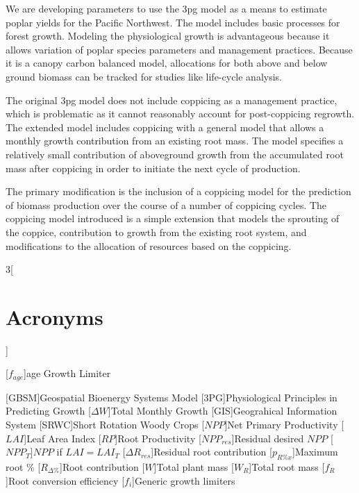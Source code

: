 \documentclass[10pt]{article}
\begin{document}
We are developing parameters to use the \acf{3pg} model as a means to
estimate poplar yields for the Pacific Northwest.  The model includes
basic processes for forest growth.  Modeling the physiological growth
is advantageous because it allows variation of poplar species
parameters and management practices.  Because it is a canopy carbon
balanced model, allocations for both above and below ground biomass
can be tracked for studies like life-cycle analysis.

The original \ac{3pg} model does not include coppicing as a management
practice, which is problematic as it cannot reasonably account for
post-coppicing regrowth.  The extended model includes coppicing with a
general model that allows a monthly growth contribution from an
existing root mass.  The model specifies a relatively small
contribution of aboveground growth from the accumulated root mass
after coppicing in order to initiate the next cycle of production.

The primary modification is the inclusion of a coppicing model for the
prediction of biomass production over the course of a number of
coppicing cycles.  The coppicing model introduced is a simple extension
that models the sprouting of the coppice, contribution to growth from
the existing root system, and modifications to the allocation of
resources based on the coppicing.

\begin{multicols}{3}[\section*{Acronyms}]
{\normalsize
\raggedright
\begin{acronym}
[\ensuremath{f_{age}}]{age Growth Limiter}

[\textsc{GBSM}]{Geospatial Bioenergy Systems Model}
[\textsc{3PG}]{Physiological Principles in Predicting Growth}
[\ensuremath{\Delta W}]{Total Monthly Growth}
[\textsc{GIS}]{Geograhical Information System}
[\textsc{SRWC}]{Short Rotation Woody Crops}
[\ensuremath{NPP}]{Net Primary Productivity}
[\ensuremath{LAI}]{Leaf Area Index}
[\ensuremath{RP}]{Root Productivity}
[\ensuremath{NPP_{res}}]{Residual desired $NPP$}
[\ensuremath{NPP_{T}}]{$NPP$ if $LAI = LAI_{T}$}
[\ensuremath{\Delta R_{res}}]{Residual root contribution}
[\ensuremath{p_{R\%x}}]{Maximum root \%}
[\ensuremath{R_{\Delta\%}}]{Root contribution}
[\ensuremath{W}]{Total plant mass}
[\ensuremath{W_R}]{Total root mass}
[\ensuremath{f_R}]{Root conversion efficiency}
[\ensuremath{f_i}]{Generic growth limiters}
\end{acronym}
}
\end{multicols}
\end{document}
